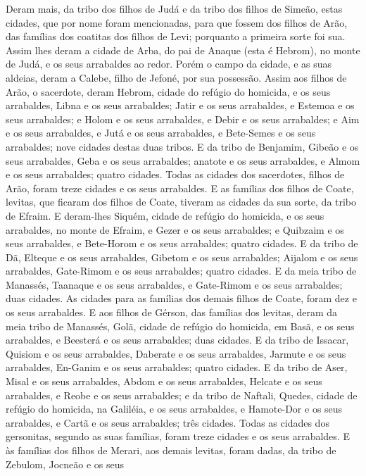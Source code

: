 Deram mais, da tribo dos filhos de Judá e da tribo dos filhos de
Simeão, estas cidades, que por nome foram mencionadas, para
que fossem dos filhos de Arão, das famílias dos coatitas dos filhos
de Levi; porquanto a primeira sorte foi sua. Assim lhes deram
a cidade de Arba, do pai de Anaque (esta é Hebrom), no monte de
Judá, e os seus arrabaldes ao redor. Porém o campo da cidade,
e as suas aldeias, deram a Calebe, filho de Jefoné, por sua
possessão. Assim aos filhos de Arão, o sacerdote, deram
Hebrom, cidade do refúgio do homicida, e os seus arrabaldes, Libna e
os seus arrabaldes; Jatir e os seus arrabaldes, e Estemoa e
os seus arrabaldes; e Holom e os seus arrabaldes, e Debir e
os seus arrabaldes; e Aim e os seus arrabaldes, e Jutá e os
seus arrabaldes, e Bete-Semes e os seus arrabaldes; nove cidades
destas duas tribos. E da tribo de Benjamim, Gibeão e os seus
arrabaldes, Geba e os seus arrabaldes; anatote e os seus
arrabaldes, e Almom e os seus arrabaldes; quatro cidades.
Todas as cidades dos sacerdotes, filhos de Arão, foram treze
cidades e os seus arrabaldes. E as famílias dos filhos de
Coate, levitas, que ficaram dos filhos de Coate, tiveram as cidades
da sua sorte, da tribo de Efraim. E deram-lhes Siquém, cidade
de refúgio do homicida, e os seus arrabaldes, no monte de Efraim, e
Gezer e os seus arrabaldes; e Quibzaim e os seus arrabaldes,
e Bete-Horom e os seus arrabaldes; quatro cidades. E da tribo
de Dã, Elteque e os seus arrabaldes, Gibetom e os seus arrabaldes;
Aijalom e os seus arrabaldes, Gate-Rimom e os seus
arrabaldes; quatro cidades. E da meia tribo de Manassés,
Taanaque e os seus arrabaldes, e Gate-Rimom e os seus arrabaldes;
duas cidades. As cidades para as famílias dos demais filhos
de Coate, foram dez e os seus arrabaldes. E aos filhos de
Gérson, das famílias dos levitas, deram da meia tribo de Manassés,
Golã, cidade de refúgio do homicida, em Basã, e os seus arrabaldes,
e Beesterá e os seus arrabaldes; duas cidades. E da tribo de
Issacar, Quisiom e os seus arrabaldes, Daberate e os seus
arrabaldes, Jarmute e os seus arrabaldes, En-Ganim e os seus
arrabaldes; quatro cidades. E da tribo de Aser, Misal e os
seus arrabaldes, Abdom e os seus arrabaldes, Helcate e os
seus arrabaldes, e Reobe e os seus arrabaldes; e da tribo de
Naftali, Quedes, cidade de refúgio do homicida, na Galiléia, e os
seus arrabaldes, e Hamote-Dor e os seus arrabaldes, e Cartã e os
seus arrabaldes; três cidades. Todas as cidades dos
gersonitas, segundo as suas famílias, foram treze cidades e os seus
arrabaldes. E às famílias dos filhos de Merari, aos demais
levitas, foram dadas, da tribo de Zebulom, Jocneão e os seus
